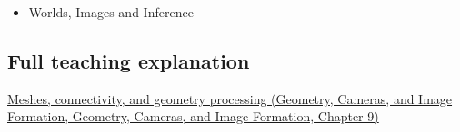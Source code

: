 \begin{itemize}
\tightlist
\item
  {Worlds, Images and Inference}
\end{itemize}

\subsection{Full teaching explanation}\label{appendix-1dd4ad54ca57-full-teaching-explanation}

\href{../03-Geometry-Cameras-and-Image-Formation/main.pdf\#nameddest=03-visual-computing-i-ch002-meshes-connectivity-and-geometry-processing}{Meshes, connectivity, and geometry processing (Geometry, Cameras, and Image Formation, Geometry, Cameras, and Image Formation, Chapter 9)}
